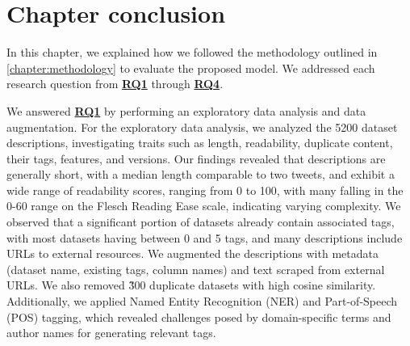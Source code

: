 


\section{Chapter conclusion}

In this chapter, we explained how we followed the methodology outlined in \cref{chapter:methodology} to evaluate the proposed model. We addressed each research question from \hyperref[rq1]{\textbf{RQ1}} through \hyperref[rq4]{\textbf{RQ4}}.

We answered \hyperref[rq1]{\textbf{RQ1}} by performing an exploratory data analysis and data augmentation. For the exploratory data analysis, we analyzed the 5200 dataset descriptions, investigating traits such as length, readability, duplicate content, their tags, features, and versions. Our findings revealed that descriptions are generally short, with a median length comparable to two tweets, and exhibit a wide range of readability scores, ranging from 0 to 100, with many falling in the 0-60 range on the Flesch Reading Ease scale, indicating varying complexity. We observed that a significant portion of datasets already contain associated tags, with most datasets having between 0 and 5 tags, and many descriptions include URLs to external resources. We augmented the descriptions with metadata (dataset name, existing tags, column names) and text scraped from external URLs. We also removed \~300 duplicate datasets with high cosine similarity. Additionally, we applied Named Entity Recognition (NER) and Part-of-Speech (POS) tagging, which revealed challenges posed by domain-specific terms and author names for generating relevant tags.

